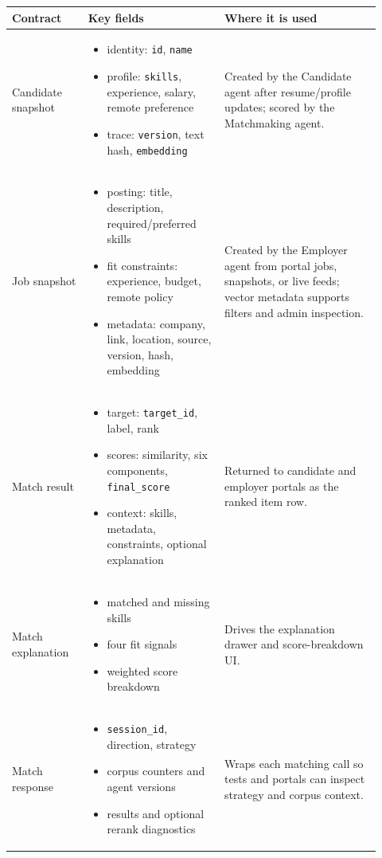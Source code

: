 \caption{Primary data contracts used by the Matchmaking agent and portals.}
\label{tab:implementation-contracts}
\scriptsize
\begin{tabular}{@{}p{0.19\linewidth}p{0.34\linewidth}p{0.39\linewidth}@{}}
\toprule
Contract & Key fields & Where it is used \\
\midrule
Candidate snapshot & \begin{itemize}[leftmargin=*,nosep]
  \item identity: \texttt{id}, \texttt{name}
  \item profile: \texttt{skills}, experience, salary, remote preference
  \item trace: \texttt{version}, text hash, \texttt{embedding}
\end{itemize} & Created by the Candidate agent after resume/profile updates; scored by the Matchmaking agent. \\
Job snapshot & \begin{itemize}[leftmargin=*,nosep]
  \item posting: title, description, required/preferred skills
  \item fit constraints: experience, budget, remote policy
  \item metadata: company, link, location, source, version, hash, embedding
\end{itemize} & Created by the Employer agent from portal jobs, snapshots, or live feeds; vector metadata supports filters and admin inspection. \\
Match result & \begin{itemize}[leftmargin=*,nosep]
  \item target: \texttt{target\_id}, label, rank
  \item scores: similarity, six components, \texttt{final\_score}
  \item context: skills, metadata, constraints, optional explanation
\end{itemize} & Returned to candidate and employer portals as the ranked item row. \\
Match explanation & \begin{itemize}[leftmargin=*,nosep]
  \item matched and missing skills
  \item four fit signals
  \item weighted score breakdown
\end{itemize} & Drives the explanation drawer and score-breakdown UI. \\
Match response & \begin{itemize}[leftmargin=*,nosep]
  \item \texttt{session\_id}, direction, strategy
  \item corpus counters and agent versions
  \item results and optional rerank diagnostics
\end{itemize} & Wraps each matching call so tests and portals can inspect strategy and corpus context. \\
\bottomrule
\end{tabular}
\normalsize
